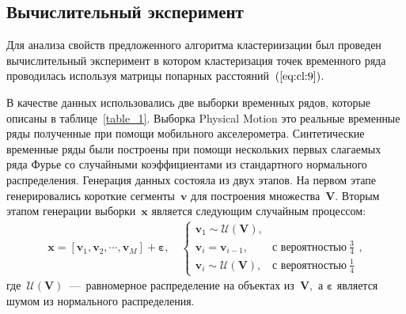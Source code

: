 
\subsection{Вычислительный эксперимент}
Для анализа свойств предложенного алгоритма кластериизации был проведен вычислительный эксперимент в котором кластеризация точек временного ряда проводилась используя матрицы попарных расстояний~$(\ref{eq:cl:9})$.

В качестве данных использовались две выборки временных рядов, которые описаны в таблице~\ref{table_1}. 
Выборка Physical Motion это реальные временные ряды полученные при помощи мобильного акселерометра. 
Синтетические временные ряды были построены при помощи нескольких первых слагаемых ряда Фурье со случайными коэффициентами из стандартного нормального распределения. 
Генерация данных состояла из двух этапов. 
На первом этапе генерировались короткие сегменты~$\textbf{v}$ для построения множества~$\mathbf{V}$. 
Вторым этапом генерации выборки~$\textbf{x}$ является следующим случайным процессом:
\begin{equation}
\label{eq:exp:1}
\begin{aligned}
\textbf{x} = [\textbf{v}_{1}, \textbf{v}_{2}, \cdots, \textbf{v}_{M}] + \bm{\varepsilon}, \quad \begin{cases}
    \textbf{v}_{1} \sim \mathcal{U}\left(\mathbf{V}\right),\\
    \textbf{v}_{i} = \textbf{v}_{i - 1}, & \text{с вероятностью}~\frac{3}{4}\\
    \textbf{v}_{i} \sim \mathcal{U}\left(\mathbf{V}\right), & \text{с вероятностью}~\frac{1}{4}
\end{cases},
\end{aligned}
\end{equation}
где~$\mathcal{U}\left(\mathbf{V}\right)$~---~равномерное распределение на объектах из~$\mathbf{V},$ а $\bm{\varepsilon}$ является шумом из нормального распределения.

